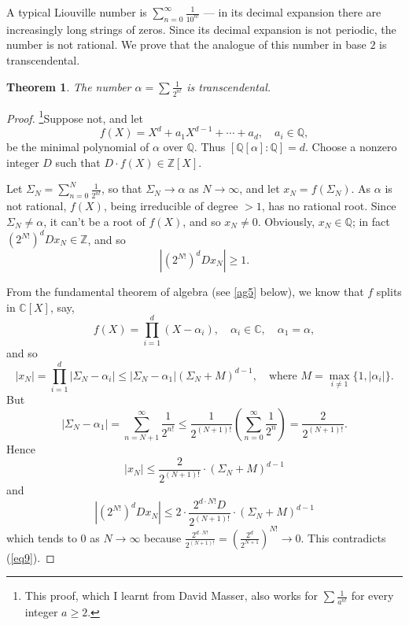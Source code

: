\documentclass[a4paper,11pt,final,openany]{memoir}
\newtheorem{theorem}[X]{Theorem}
\theoremstyle{nonumberplain}
\newtheorem{proof}{Proof.}
\begin{document}
A typical Liouville number is $\sum_{n=0}^{\infty}\frac{1}{10^{n!}}$ --- in
its decimal expansion there are increasingly long strings of zeros. Since its
decimal expansion is not periodic, the number is not rational. We prove that
the analogue of this number in base $2$ is transcendental.

\begin{theorem}
\label{ef23}%
%
The number $\alpha=\sum\frac{1}{2^{n!}}$ is transcendental.
\end{theorem}

\begin{proof}
\footnote{This proof, which I learnt from David Masser, also works for $%
{\textstyle\sum}
\frac{1}{a^{n!}}$ for every integer $a\geq2$.}Suppose not, and let
\[
f(X)=X^{d}+a_{1}X^{d-1}+\cdots+a_{d},\quad a_{i}\in\mathbb{Q},
\]
be the minimal polynomial of $\alpha$ over $\mathbb{Q}$. Thus $[\mathbb{Q}%
[\alpha]\colon\mathbb{Q}]=d$. Choose a nonzero integer $D$ such that $D\cdot
f(X)\in\mathbb{Z}[X]$.

Let $\Sigma_{N}=\sum_{n=0}^{N}\frac{1}{2^{n!}}$, so that $\Sigma
_{N}\rightarrow\alpha$ as $N\rightarrow\infty$, and let $x_{N}=f(\Sigma_{N})$.
As $\alpha$ is not rational, $f(X)$, being irreducible of degree $>1$, has no
rational root. Since $\Sigma_{N}\neq\alpha$, it can't be a root of $f(X)$, and
so $x_{N}\neq0$. Obviously, $x_{N}\in\mathbb{Q}$; in fact $(2^{N!})^{d}%
Dx_{N}\in\mathbb{Z}$, and so
\begin{equation}
|(2^{N!})^{d}Dx_{N}|\geq1\text{.} \label{eq9}%
\end{equation}


From the fundamental theorem of algebra%
(see \ref{ag5} below), we know that $f$ splits in $\mathbb{C}{}[X]$, say,%
\[
f(X)=\prod_{i=1}^{d}(X-\alpha_{i}),\quad\alpha_{i}\in\mathbb{C},\quad
\alpha_{1}=\alpha,
\]
and so
\[
|x_{N}|=\prod_{i=1}^{d}|\Sigma_{N}-\alpha_{i}|\leq|\Sigma_{N}-\alpha
_{1}|(\Sigma_{N}+M)^{d-1},\quad\text{where }M=\max_{i\neq1}\{1,|\alpha
_{i}|\}\text{.}%
\]
But
\[
|\Sigma_{N}-\alpha_{1}|=\sum_{n=N+1}^{\infty}\frac{1}{2^{n!}}\leq\frac
{1}{2^{(N+1)!}}\left(  \sum_{n=0}^{\infty}\frac{1}{2^{n}}\right)  =\frac
{2}{2^{(N+1)!}}.
\]
Hence%
\[
|x_{N}|\leq\frac{2}{2^{(N+1)!}}\cdot(\Sigma_{N}+M)^{d-1}%
\]
and
\[
|(2^{N!})^{d}Dx_{N}|\leq2\cdot\frac{2^{d\cdot N!}D}{2^{(N+1)!}}\cdot
(\Sigma_{N}+M)^{d-1}%
\]
which tends to $0$ as $N\rightarrow\infty$ because $\frac{2^{d\cdot N!}%
}{2^{(N+1)!}}=\left(  \frac{2^{d}}{2^{N+1}}\right)  ^{N!}\rightarrow0$. This
contradicts (\ref{eq9}).
\end{proof}
\end{document}
